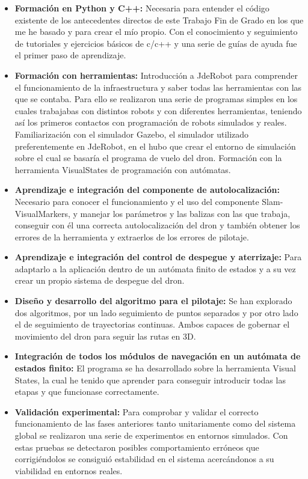 \begin{itemize}
	\item \textbf{Formación en Python y C++:} Necesaria para entender el código existente de los antecedentes
directos de este Trabajo Fin de
Grado en los que me he basado y para crear el mío propio. Con el conocimiento y seguimiento de tutoriales y ejercicios básicos de c/c++ y una serie de guías de ayuda fue el  primer paso de aprendizaje.
	\item \textbf{Formación con herramientas:} Introducción a JdeRobot para comprender el funcionamiento de la infraestructura y saber todas las herramientas con las que se contaba. Para ello se realizaron una serie de programas simples en los cuales trabajabas con distintos robots y con diferentes herramientas, teniendo así los primeros contactos con programación de robots simulados y reales. Familiarización con el simulador Gazebo, el simulador utilizado preferentemente en JdeRobot, en el hubo que crear el entorno de simulación sobre el cual se basaría el programa de vuelo del dron. Formación con la herramienta VisualStates de programación con autómatas.	
	\item \textbf{Aprendizaje e integración del componente de autolocalización:} Necesario para conocer el funcionamiento y el uso del componente Slam-VisualMarkers, y manejar los parámetros y las balizas con las que trabaja, conseguir con él una correcta autolocalización del dron y también obtener los errores de la herramienta y extraerlos de los errores de pilotaje.
	\item \textbf{Aprendizaje e integración del control de despegue y aterrizaje:} Para adaptarlo a la aplicación dentro de un autómata finito de estados y a su vez crear un propio sistema de despegue del dron.
	\item \textbf{Diseño y desarrollo del algoritmo para el pilotaje:} Se han explorado dos algoritmos, por un lado seguimiento de puntos separados y por otro lado el de seguimiento de trayectorias continuas. Ambos capaces de gobernar el movimiento del dron para seguir las rutas en 3D.
	\item \textbf{Integración de todos los módulos de navegación en un autómata de estados finito:} El programa se ha desarrollado sobre la herramienta Visual States, la cual he tenido que aprender para conseguir introducir todas las etapas y que funcionase correctamente. 
	\item \textbf{Validación experimental:} Para comprobar y validar el correcto funcionamiento de las fases anteriores tanto unitariamente como del sistema global se realizaron una serie de experimentos en entornos simulados. Con estas pruebas se detectaron posibles comportamiento erróneos que corrigiéndolos se consiguió estabilidad en el sistema acercándonos a su viabilidad en entornos reales.   
\end{itemize}
